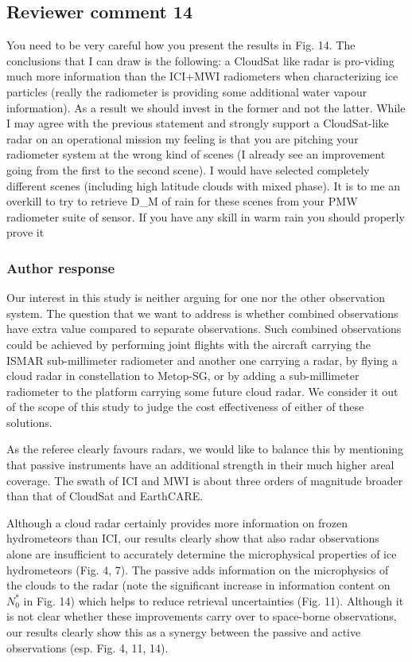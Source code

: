 \documentclass[11pt]{scrartcl}
\begin{document}
\subsection*{Reviewer comment 14}
You need to be very careful how you present the results in Fig. 14. The
conclusions that I can draw is the following: a CloudSat like radar is
pro-viding much more information than the ICI+MWI radiometers when
characterizing ice particles (really the radiometer is providing some additional
water vapour information). As a result we should invest in the former and not the
latter. While I may agree with the previous statement and strongly support a
CloudSat-like radar on an operational mission my feeling is that you are
pitching your radiometer system at the wrong kind of scenes (I already see an
improvement going from the first to the second scene). I would have selected
completely different scenes (including high latitude clouds with mixed phase). It
is to me an overkill to try to retrieve D\_M of rain for these scenes from your
PMW radiometer suite of sensor. If you have any skill in warm rain you
should properly prove it

\subsubsection*{Author response}

Our interest in this study is neither arguing for one nor the other observation
system. The question that we want to address is whether combined observations
have extra value compared to separate observations. Such combined observations
could be achieved by performing joint flights with the aircraft carrying the
ISMAR sub-millimeter radiometer and another one carrying a radar, by flying a
cloud radar in constellation to Metop-SG, or by adding a sub-millimeter
radiometer to the platform carrying some future cloud radar. We consider it out
of the scope of this study to judge the cost effectiveness of either of these
solutions.

As the referee clearly favours radars, we would like to balance this by mentioning that
passive instruments have an additional strength in their much higher areal coverage. The
swath of ICI and MWI is about three orders of magnitude broader than that of CloudSat
and EarthCARE.

Although a cloud radar certainly provides more information on frozen
hydrometeors than ICI, our results clearly show that also radar observations
alone are insufficient to accurately determine the microphysical properties of
ice hydrometeors (Fig. 4, 7). The passive adds information on the microphysics
of the clouds to the radar (note the significant increase in information content
on $N_0^*$ in Fig. 14) which helps to reduce retrieval uncertainties (Fig. 11).
Although it is not clear whether these improvements carry over to space-borne
observations, our results clearly show this as a synergy between the passive and
active observations (esp. Fig. 4, 11, 14).
\end{document}
